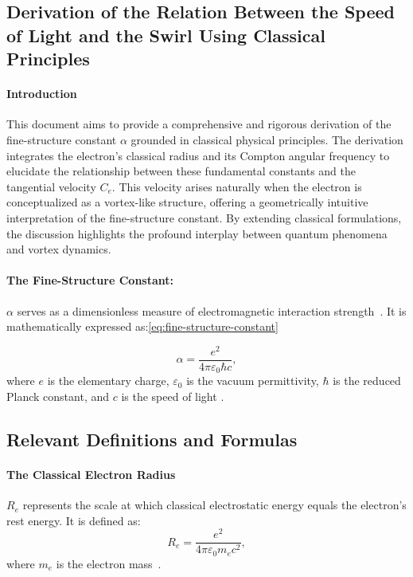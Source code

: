 \documentclass[a4paper,10pt]{article}
\begin{document}

\subsection{Derivation of the Relation Between the Speed of Light and the Swirl Using Classical Principles}\label{subsec:derivation-of-the-relation-between-the-speed-of-light-and-the-swirl-using-classical-principles}

\paragraph*{Introduction}
    This document aims to provide a comprehensive and rigorous derivation of the fine-structure constant $\alpha$ grounded in classical physical principles.
    The derivation integrates the electron's classical radius and its Compton angular frequency to elucidate the relationship between these fundamental constants and the tangential velocity $C_e$.
    This velocity arises naturally when the electron is conceptualized as a vortex-like structure, offering a geometrically intuitive interpretation of the fine-structure constant.
    By extending classical formulations, the discussion highlights the profound interplay between quantum phenomena and vortex dynamics.


\paragraph*{The Fine-Structure Constant:}
 $\alpha$ serves as a dimensionless measure of electromagnetic interaction strength~\cite{maxwell1861}.
It is mathematically expressed as:\ref{eq:fine-structure-constant}

\begin{equation}
    \alpha = \frac{e^2}{4\pi \varepsilon_0 \hbar c},\label{eq:fine-structure-constant}
\end{equation}
where $e$ is the elementary charge, $\varepsilon_0$ is the vacuum permittivity, $\hbar$ is the reduced Planck constant, and $c$ is the speed of light \cite{dirac1930quantum}.

\subsection*{Relevant Definitions and Formulas}
\paragraph*{The Classical Electron Radius}
$R_e$ represents the scale at which classical electrostatic energy equals the electron's rest energy. It is defined as:
\begin{equation*}
    R_e = \frac{e^2}{4\pi \varepsilon_0 m_e c^2},
\end{equation*}
where $m_e$ is the electron mass~\cite{helmholtz1858}.
\end{document}
